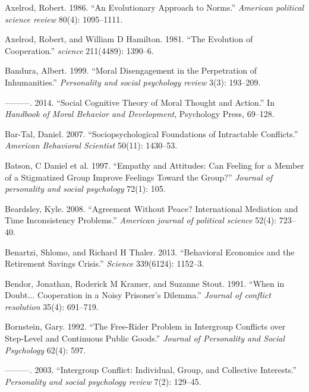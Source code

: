 \documentclass[11pt]{article}
\begin{document}
\leavevmode\hypertarget{ref-axelrod1986evolutionary}{}%
Axelrod, Robert. 1986. ``An Evolutionary Approach to Norms.''
\emph{American political science review} 80(4): 1095--1111.

\leavevmode\hypertarget{ref-axelrod1981evolution}{}%
Axelrod, Robert, and William D Hamilton. 1981. ``The Evolution of
Cooperation.'' \emph{science} 211(4489): 1390--6.

\leavevmode\hypertarget{ref-bandura1999moral}{}%
Bandura, Albert. 1999. ``Moral Disengagement in the Perpetration of
Inhumanities.'' \emph{Personality and social psychology review} 3(3):
193--209.

\leavevmode\hypertarget{ref-bandura2014social}{}%
---------. 2014. ``Social Cognitive Theory of Moral Thought and
Action.'' In \emph{Handbook of Moral Behavior and Development},
Psychology Press, 69--128.

\leavevmode\hypertarget{ref-bar2007sociopsychological}{}%
Bar-Tal, Daniel. 2007. ``Sociopsychological Foundations of Intractable
Conflicts.'' \emph{American Behavioral Scientist} 50(11): 1430--53.

\leavevmode\hypertarget{ref-batson1997empathy}{}%
Batson, C Daniel et al. 1997. ``Empathy and Attitudes: Can Feeling for a
Member of a Stigmatized Group Improve Feelings Toward the Group?''
\emph{Journal of personality and social psychology} 72(1): 105.

\leavevmode\hypertarget{ref-beardsley2008agreement}{}%
Beardsley, Kyle. 2008. ``Agreement Without Peace? International
Mediation and Time Inconsistency Problems.'' \emph{American journal of
political science} 52(4): 723--40.

\leavevmode\hypertarget{ref-benartzi2013behavioral}{}%
Benartzi, Shlomo, and Richard H Thaler. 2013. ``Behavioral Economics and
the Retirement Savings Crisis.'' \emph{Science} 339(6124): 1152--3.

\leavevmode\hypertarget{ref-bendor1991doubt}{}%
Bendor, Jonathan, Roderick M Kramer, and Suzanne Stout. 1991. ``When in
Doubt... Cooperation in a Noisy Prisoner's Dilemma.'' \emph{Journal of
conflict resolution} 35(4): 691--719.

\leavevmode\hypertarget{ref-bornstein1992free}{}%
Bornstein, Gary. 1992. ``The Free-Rider Problem in Intergroup Conflicts
over Step-Level and Continuous Public Goods.'' \emph{Journal of
Personality and Social Psychology} 62(4): 597.

\leavevmode\hypertarget{ref-bornstein2003intergroup}{}%
---------. 2003. ``Intergroup Conflict: Individual, Group, and
Collective Interests.'' \emph{Personality and social psychology review}
7(2): 129--45.
\end{document}
